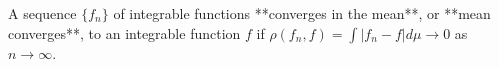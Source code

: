 A sequence $\{f_n\}$ of integrable functions **converges in the mean**, or **mean converges**, to an integrable function $f$ if $\rho(f_n, f) = \int |f_n - f| d\mu \to 0$ as $n \to \infty$.
